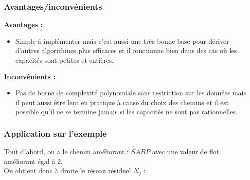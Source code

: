 \documentclass[a4paper]{article}
\begin{document}
\subsubsection{Avantages/inconvénients}
\textbf{Avantages :}
\begin{itemize}
    \item Simple à implémenter mais c'est aussi une très bonne base pour dériver d'autres algorithmes plus efficaces et il fonctionne bien dans des cas où les capacités sont petites et entières.
\end{itemize}

\textbf{Inconvénients :}
\begin{itemize}
    \item Pas de borne de complexité polynomiale sans restriction sur les données mais il peut aussi être lent en pratique à cause du choix des chemins et il est possible qu'il ne se termine jamais si les capacités ne sont pas rationnelles.
\end{itemize}
\subsubsection{Application sur l'exemple}
Tout d'abord, on a le chemin améliorant : $SABP$ avec une valeur de flot améliorant égal à $2$.\\
On obtient donc à droite le réseau résiduel $N_f$ :
\end{document}
